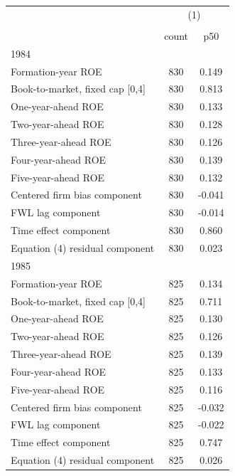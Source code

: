 {
\def\sym#1{\ifmmode^{#1}\else\(^{#1}\)\fi}
\begin{tabular}{l*{1}{cc}}
\hline\hline
                    &\multicolumn{2}{c}{(1)}  \\
                    &\multicolumn{2}{c}{}     \\
                    &       count&         p50\\
\hline
1984                &            &            \\
Formation-year ROE  &         830&       0.149\\
Book-to-market, fixed cap [0,4]&         830&       0.813\\
One-year-ahead ROE  &         830&       0.133\\
Two-year-ahead ROE  &         830&       0.128\\
Three-year-ahead ROE&         830&       0.126\\
Four-year-ahead ROE &         830&       0.139\\
Five-year-ahead ROE &         830&       0.132\\
Centered firm bias component&         830&      -0.041\\
FWL lag component   &         830&      -0.014\\
Time effect component&         830&       0.860\\
Equation (4) residual component&         830&       0.023\\
\hline
1985                &            &            \\
Formation-year ROE  &         825&       0.134\\
Book-to-market, fixed cap [0,4]&         825&       0.711\\
One-year-ahead ROE  &         825&       0.130\\
Two-year-ahead ROE  &         825&       0.126\\
Three-year-ahead ROE&         825&       0.139\\
Four-year-ahead ROE &         825&       0.133\\
Five-year-ahead ROE &         825&       0.116\\
Centered firm bias component&         825&      -0.032\\
FWL lag component   &         825&      -0.022\\
Time effect component&         825&       0.747\\
Equation (4) residual component&         825&       0.026\\

\end{tabular}}
